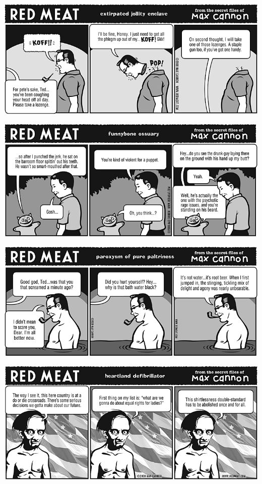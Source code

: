 \documentclass[a4paper,twoside,11pt]{article}
\begin{document}
\includegraphics[width=\textwidth]{redmeat_2008-08-26.png}



\includegraphics[width=\textwidth]{redmeat_2008-09-02.png}



\includegraphics[width=\textwidth]{redmeat_2008-09-09.png}



\includegraphics[width=\textwidth]{redmeat_2008-09-16.png}
\end{document}
